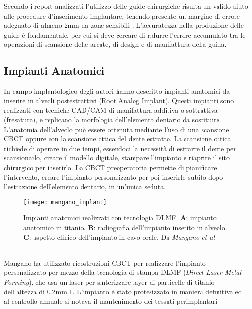 Secondo i report analizzati l'utilizzo delle guide chirurgiche risulta un valido aiuto alle procedure d'inserimento implantare, tenendo presente un margine di errore adeguato di almeno 2mm da zone sensibili \parencite{Reference104}. L'accuratezza nella produzione delle guide è fondamentale, per cui si deve cercare di ridurre l'errore accumulato tra le operazioni di scansione delle arcate, di design e di manifattura della guida.
 

\subsection{Impianti Anatomici}
In campo implantologico degli autori hanno descritto impianti anatomici da inserire in alveoli postestrattivi (Root Analog Implant). Questi impianti sono realizzati con tecniche CAD/CAM di manifattura additiva o sottrattiva (fresatura), e replicano la morfologia dell'elemento dentario da sostituire. L'anatomia dell'alveolo può essere ottenuta mediante l'uso di una scansione CBCT oppure con la scansione ottica del dente estratto. La scansione ottica richiede di operare in due tempi, essendoci la necessità di estrarre il dente per scansionarlo, creare il modello digitale, stampare l'impianto e riaprire il sito chirurgico per inserirlo. La CBCT preoperatoria permette di pianificare l'intervento, creare l'impianto personalizzato per poi inserirlo subito dopo l'estrazione dell'elemento dentario, in un'unica seduta.
\begin{figure}[h]
\vspace{-10pt}
	\begin{center}
	\texttt{[image: mangano\_implant]}
    \caption{Impianti anatomici realizzati con tecnologia DLMF. \textbf{A}: impianto anatomico in titanio. \textbf{B}: radiografia dell'impianto inserito in alveolo. \textbf{C}: aspetto clinico dell'impianto in cavo orale. Da \emph{Mangano et al} \parencite{Reference84}}
    \label{fig:mangano_implant}
    \end{center}
\vspace{-20pt}
\end{figure}
\\
Mangano \parencite{Reference84} ha utilizzato ricostruzioni CBCT per realizzare l'impianto personalizzato per mezzo della tecnologia di stampa DLMF (\emph{Direct Laser Metal Forming}), che usa un laser per sinterizzare layer di particelle di titanio dell'altezza di 0.2mm \ref{fig:mangano_implant}. L'impianto è stato protesizzato in maniera definitiva ed al controllo annuale si notava il mantenimento dei tessuti perimplantari.\\
